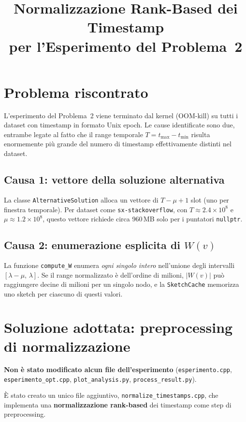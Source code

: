 \documentclass[a4paper,11pt]{article}
\title{Normalizzazione Rank-Based dei Timestamp\\per l'Esperimento del Problema~2}
\author{}
\date{}
\begin{document}
\maketitle

\section{Problema riscontrato}

L'esperimento del Problema~2 viene terminato dal kernel (OOM-kill) su tutti i dataset con timestamp in formato Unix epoch. Le cause identificate sono due, entrambe legate al fatto che il range temporale $T = t_{\max} - t_{\min}$ risulta enormemente pi\`u grande del numero di timestamp effettivamente distinti nel dataset.

\subsection{Causa 1: vettore della soluzione alternativa}

La classe \texttt{AlternativeSolution} alloca un vettore di $T - \mu + 1$ slot (uno per finestra temporale). Per dataset come \texttt{sx-stackoverflow}, con $T \approx 2.4 \times 10^8$ e $\mu \approx 1.2 \times 10^8$, questo vettore richiede circa 960\,MB solo per i puntatori \texttt{nullptr}.

\subsection{Causa 2: enumerazione esplicita di $W(v)$}

La funzione \texttt{compute\_W} enumera \emph{ogni singolo intero} nell'unione degli intervalli $[\lambda - \mu,\, \lambda]$. Se il range normalizzato \`e dell'ordine di milioni, $|W(v)|$ pu\`o raggiungere decine di milioni per un singolo nodo, e la \texttt{SketchCache} memorizza uno sketch per ciascuno di questi valori.

\section{Soluzione adottata: preprocessing di normalizzazione}

\textbf{Non \`e stato modificato alcun file dell'esperimento} (\texttt{esperimento.cpp}, \texttt{esperimento\_opt.cpp}, \texttt{plot\_analysis.py}, \texttt{process\_result.py}).

\`E stato creato un unico file aggiuntivo, \texttt{normalize\_timestamps.cpp}, che implementa una \textbf{normalizzazione rank-based} dei timestamp come step di preprocessing.
\end{document}
